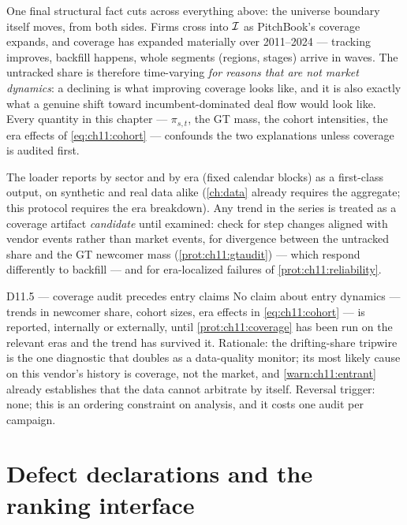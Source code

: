 One final structural fact cuts across everything above: the universe
boundary itself moves, from both sides. Firms cross into $\mathcal{I}$ as
PitchBook's coverage expands, and coverage has expanded materially over
2011--2024 --- tracking improves, backfill happens, whole segments
(regions, stages) arrive in waves. The untracked share is therefore
time-varying \emph{for reasons that are not market dynamics}: a declining
 is what improving coverage looks like, and it
is also exactly what a genuine shift toward incumbent-dominated deal flow
would look like. Every quantity in this chapter --- $\pi_{s,t}$, the GT
mass, the cohort intensities, the era effects of
\cref{eq:ch11:cohort} --- confounds the two explanations unless coverage
is audited first.

\begin{protocol}\label{prot:ch11:coverage}
The loader reports  by sector and by era
(fixed calendar blocks) as a first-class output, on synthetic and real
data alike (\cref{ch:data} already requires the aggregate; this protocol
requires the era breakdown). Any trend in the series is treated as a
coverage artifact \emph{candidate} until examined: check for step
changes aligned with vendor events rather than market events, for
divergence between the untracked share and the GT newcomer mass
(\cref{prot:ch11:gtaudit}) --- which respond differently to backfill ---
and for era-localized failures of \cref{prot:ch11:reliability}.
\end{protocol}

\begin{decision}{D11.5 --- coverage audit precedes entry claims}
No claim about entry dynamics --- trends in newcomer share, cohort sizes,
era effects in \cref{eq:ch11:cohort} --- is reported, internally or
externally, until \cref{prot:ch11:coverage} has been run on the relevant
eras and the trend has survived it. Rationale: the drifting-share
tripwire is the one diagnostic that doubles as a data-quality monitor;
its most likely cause on this vendor's history is coverage, not the
market, and \cref{warn:ch11:entrant} already establishes that the data
cannot arbitrate by itself. Reversal trigger: none; this is an ordering
constraint on analysis, and it costs one audit per campaign.
\end{decision}

\section{Defect declarations and the ranking interface}\label{ch11:sec:defects}

